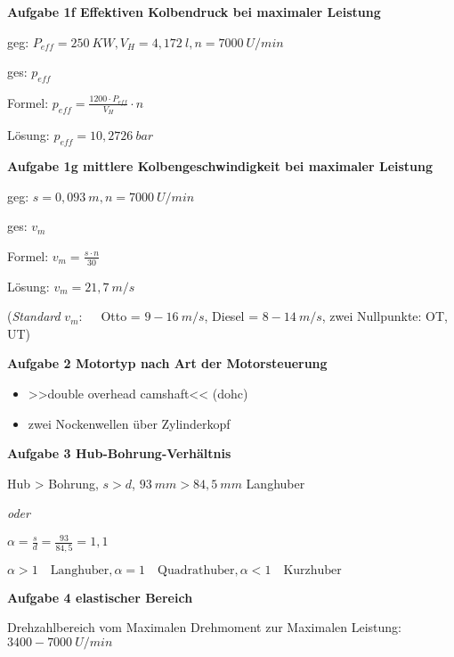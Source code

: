 \textbf{Aufgabe 1f Effektiven Kolbendruck bei maximaler Leistung}

geg: $P_{eff} = 250~KW, V_H = 4,172~l, n = 7000~U/min$

ges: $p_{eff}$

Formel: $p_{eff} = \frac{1200 \cdot P_{eff}}{V_H} \cdot n$

Lösung: $p_{eff} = 10,2726~bar$

\textbf{Aufgabe 1g mittlere Kolbengeschwindigkeit bei maximaler
Leistung}

geg: $s = 0,093~m, n = 7000~U/min$

ges: $v_m$

Formel: $v_m = \frac{s \cdot n}{30}$

Lösung: $v_m = 21,7~m/s$

(\emph{Standard} $v_m: \quad$ Otto = $9 - 16~m/s$, Diesel =
$8 - 14~m/s$, zwei Nullpunkte: OT, UT)

\textbf{Aufgabe 2 Motortyp nach Art der Motorsteuerung}

\begin{itemize}
\item
  >>double overhead camshaft<< (dohc)
\item
  zwei Nockenwellen über Zylinderkopf
\end{itemize}

\textbf{Aufgabe 3 Hub-Bohrung-Verhältnis}

Hub > Bohrung, $s > d$, $93~mm > 84,5~mm$ Langhuber

\emph{oder}

$\alpha = \frac{s}{d} = \frac{93}{84,5} = 1,1$

$\boxed{\alpha > 1 \quad \text{Langhuber}, \alpha = 1 \quad \text{Quadrathuber}, \alpha < 1 \quad \text{Kurzhuber}}$

\textbf{Aufgabe 4 elastischer Bereich}

Drehzahlbereich vom Maximalen Drehmoment zur Maximalen Leistung:
$3400 - 7000~U/min$
